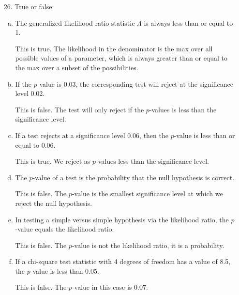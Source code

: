 \documentclass{article}
\begin{document}
\begin{itemize}
	\item[26.] True or false:
		\begin{enumerate}[a.]
			\item The generalized likelihood ratio statistic $\Lambda$ is always less than or equal to 1.
				\begin{answer*}
					This is true. The likelihood in the denominator is the max over all possible values of a parameter, which is always greater than or equal to the max over a subset of the possibilities.
				\end{answer*}

			\item If the $p$-value is 0.03, the corresponding test will reject at the significance level 0.02.
				\begin{answer*}
					This is false. The test will only reject if the $p$-values is less than the significance level.
				\end{answer*}

			\item If a test rejects at a significance level 0.06, then the $p$-value is less than or equal to 0.06.
				\begin{answer*}
					This is true. We reject as $p$-values less than the significance level.
				\end{answer*}

			\item The $p$-value of a test is the probability that the null hypothesis is correct.
				\begin{answer*}
					This is false. The $p$-value is the smallest significance level at which we reject the null hypothesis.
				\end{answer*}

			\item In testing a simple versus simple hypothesis via the likelihood ratio, the $p$-value equals the likelihood ratio.
				\begin{answer*}
					This is false. The $p$-value is not the likelihood ratio, it is a probability.
				\end{answer*}

			\item If a chi-square test statistic with 4 degrees of freedom has a value of 8.5, the $p$-value is less than 0.05.
				\begin{answer*}
					This is false. The $p$-value in this case is 0.07.
				\end{answer*}
				
		\end{enumerate}


\end{itemize}
\end{document}
